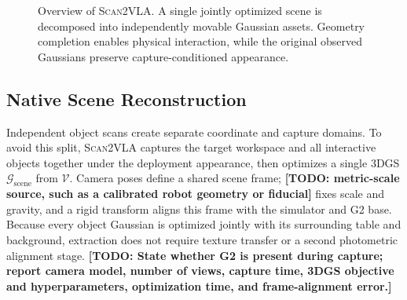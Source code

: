 \documentclass[letterpaper,10pt,conference]{ieeeconf}
\newcommand{\system}{\textsc{Scan2VLA}}
\newcommand{\todo}[1]{\textbf{[TODO: #1]}}
\begin{document}
\begin{figure}[t]
  \centering
  \caption{Overview of \system{}. A single jointly optimized scene is
  decomposed into independently movable Gaussian assets. Geometry completion
  enables physical interaction, while the original observed Gaussians preserve
  capture-conditioned appearance.}
  \label{fig:pipeline}
\end{figure}

\subsection{Native Scene Reconstruction}
Independent object scans create separate coordinate and capture domains. To
avoid this split, \system{} captures the target workspace and all interactive
objects together under the deployment appearance, then optimizes a single 3DGS
$\mathcal{G}_{\mathrm{scene}}$ from $\mathcal{V}$. Camera poses define a shared
scene frame; \todo{metric-scale source, such as a calibrated robot geometry or
fiducial} fixes scale and gravity, and a rigid transform aligns this frame with
the simulator and G2 base. Because every object Gaussian is optimized jointly
with its surrounding table and background, extraction does not require texture
transfer or a second photometric alignment stage. \todo{State whether G2 is
present during capture; report camera model, number of views, capture time,
3DGS objective and hyperparameters, optimization time, and frame-alignment
error.}
\end{document}
